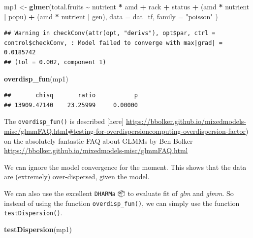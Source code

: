 \documentclass[
  12pt,
]{book}
\newenvironment{Shaded}{\begin{snugshade}}{\end{snugshade}}
\newcommand{\DataTypeTok}[1]{\textcolor[rgb]{0.13,0.29,0.53}{#1}}
\newcommand{\KeywordTok}[1]{\textcolor[rgb]{0.13,0.29,0.53}{\textbf{#1}}}
\newcommand{\NormalTok}[1]{#1}
\newcommand{\OperatorTok}[1]{\textcolor[rgb]{0.81,0.36,0.00}{\textbf{#1}}}
\newcommand{\StringTok}[1]{\textcolor[rgb]{0.31,0.60,0.02}{#1}}
\begin{document}
\begin{Shaded}
\begin{Highlighting}[]
\NormalTok{mp1 \textless{}{-}}\StringTok{ }\KeywordTok{glmer}\NormalTok{(total.fruits }\OperatorTok{\textasciitilde{}}\StringTok{ }\NormalTok{nutrient }\OperatorTok{*}\StringTok{ }\NormalTok{amd }\OperatorTok{+}
\StringTok{  }\NormalTok{rack }\OperatorTok{+}\StringTok{ }\NormalTok{status }\OperatorTok{+}
\StringTok{  }\NormalTok{(amd }\OperatorTok{*}\StringTok{ }\NormalTok{nutrient }\OperatorTok{|}\StringTok{ }\NormalTok{popu) }\OperatorTok{+}
\StringTok{  }\NormalTok{(amd }\OperatorTok{*}\StringTok{ }\NormalTok{nutrient }\OperatorTok{|}\StringTok{ }\NormalTok{gen),}
\DataTypeTok{data =}\NormalTok{ dat\_tf, }\DataTypeTok{family =} \StringTok{"poisson"}
\NormalTok{)}
\end{Highlighting}
\end{Shaded}

\begin{verbatim}
## Warning in checkConv(attr(opt, "derivs"), opt$par, ctrl = control$checkConv, : Model failed to converge with max|grad| = 0.0185742
## (tol = 0.002, component 1)
\end{verbatim}

\begin{Shaded}
\begin{Highlighting}[]
\KeywordTok{overdisp\_fun}\NormalTok{(mp1)}
\end{Highlighting}
\end{Shaded}

\begin{verbatim}
##       chisq       ratio           p 
## 13909.47140    23.25999     0.00000
\end{verbatim}

The \texttt{overdisp\_fun()} is described {[}here{]} \url{https://bbolker.github.io/mixedmodels-misc/glmmFAQ.html\#testing-for-overdispersioncomputing-overdispersion-factor}) on the absolutely fantastic FAQ about GLMMs by Ben Bolker \url{https://bbolker.github.io/mixedmodels-misc/glmmFAQ.html}

We can ignore the model convergence for the moment. This shows that the data are (extremely) over-dispersed, given the model.

We can also use the excellent \texttt{DHARMa} 📦 \citep{R-DHARMa} to evaluate fit of \emph{glm} and \emph{glmm}. So instead of using the function \texttt{overdisp\_fun()}, we can simply use the function \texttt{testDispersion()}.

\begin{Shaded}
\begin{Highlighting}[]
\KeywordTok{testDispersion}\NormalTok{(mp1)}
\end{Highlighting}
\end{Shaded}
\end{document}
